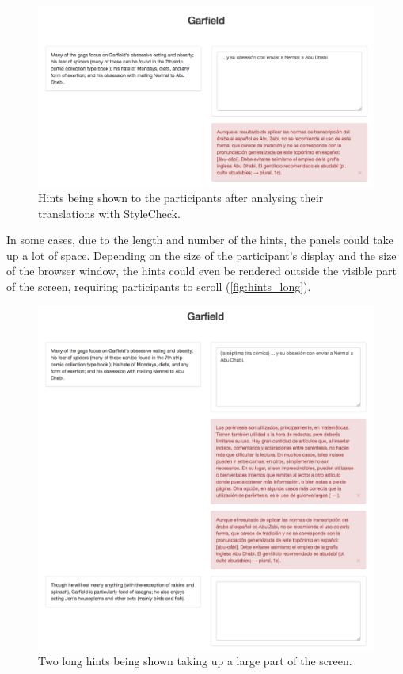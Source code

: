 \begin{figure}[h]
\myfloatalign
\includegraphics[width=\textwidth]{img/hints/hints.png}
\caption{Hints being shown to the participants after analysing their translations with StyleCheck.}
\label{fig:hints}
\end{figure}

In some cases, due to the length and number of the hints, the panels could take up a lot of space.  Depending on the size of the participant's display and the size of the browser window, the hints could even be rendered outside the visible part of the screen, requiring participants to scroll (\autoref{fig:hints_long}).

\begin{figure}[!ht]
\myfloatalign
\includegraphics[width=\textwidth]{img/hints/hints_long.png}
\caption{Two long hints being shown taking up a large part of the screen.}
\label{fig:hints_long}
\end{figure}

